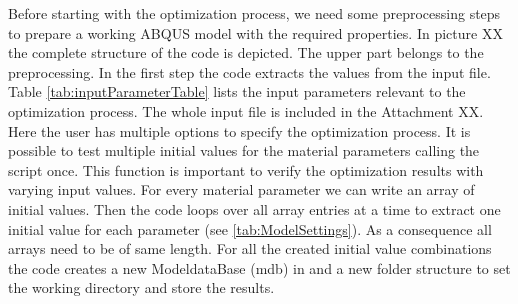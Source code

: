    Before starting with the optimization process, we need some preprocessing steps to prepare a working ABQUS model with the required properties. In picture XX the complete structure of the code is depicted. The upper part belongs to the preprocessing. In the first step the code extracts the values from the input file. Table \autoref{tab:inputParameterTable} lists the input parameters relevant to the optimization process. The whole input file is included in the Attachment XX. Here the user has multiple options to specify the optimization process. It is possible to test multiple initial values for the material parameters calling the script once. This function is important to verify the optimization results with varying input values. For every material parameter we can write an array of initial values. Then the code loops over all array entries at a time to extract one initial value for each parameter (see \autoref{tab:ModelSettings}). As a consequence all arrays need to be of same length. For all the created initial value combinations the code creates a new ModeldataBase (mdb) in  and a new folder structure to set the working directory and store the results.
    

